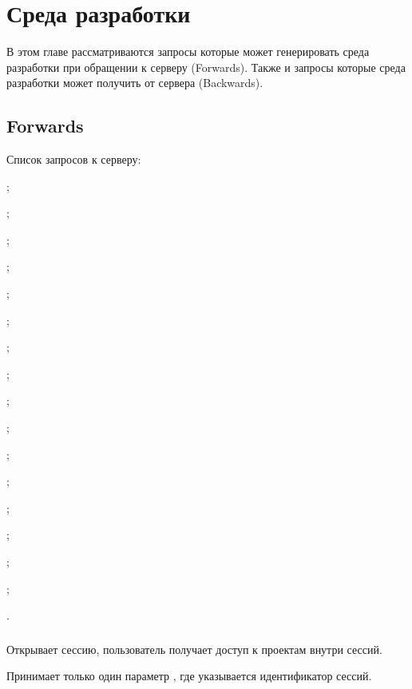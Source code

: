 \section{Среда разработки}

В этом главе рассматриваются запросы которые может генерировать среда разработки при обращении к серверу (Forwards). Также и запросы которые среда разработки может получить от сервера (Backwards).

\subsection{Forwards}

Список запросов к серверу:
\begin{icItems}
	\item {};
	\item {};
	\item {};
	\item {};
	\item {};
	\item {};
	\item {};
	\item {};
	\item {};
	\item {};
	\item {};
	\item {};
	\item {};
	\item {};
	\item {};
	\item {};
	\item {}.
\end{icItems}

\subsubsection{}

Открывает сессию, пользователь получает доступ к проектам внутри сессий.

Принимает только один параметр , где указывается идентификатор сессий.

